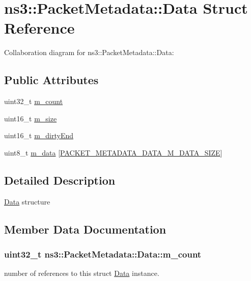 \hypertarget{structns3_1_1PacketMetadata_1_1Data}{}\section{ns3\+:\+:Packet\+Metadata\+:\+:Data Struct Reference}
\label{structns3_1_1PacketMetadata_1_1Data}


Collaboration diagram for ns3\+:\+:Packet\+Metadata\+:\+:Data\+:
\subsection*{Public Attributes}
\begin{DoxyCompactItemize}
\item 
uint32\+\_\+t \hyperlink{structns3_1_1PacketMetadata_1_1Data_ab1fff6472c58d4cbef74f8d78f64f95a}{m\+\_\+count}
\item 
uint16\+\_\+t \hyperlink{structns3_1_1PacketMetadata_1_1Data_a1064e5617aec301dd4f28fb86c105848}{m\+\_\+size}
\item 
uint16\+\_\+t \hyperlink{structns3_1_1PacketMetadata_1_1Data_ae98316cc438fb40663c2f848746d8935}{m\+\_\+dirty\+End}
\item 
uint8\+\_\+t \hyperlink{structns3_1_1PacketMetadata_1_1Data_a98540e1e160a9c59048d4cf615b8e2a2}{m\+\_\+data} \mbox{[}\hyperlink{packet-metadata_8h_a6e9dfb20738a271bc45a4c2929a9a500}{P\+A\+C\+K\+E\+T\+\_\+\+M\+E\+T\+A\+D\+A\+T\+A\+\_\+\+D\+A\+T\+A\+\_\+\+M\+\_\+\+D\+A\+T\+A\+\_\+\+S\+I\+ZE}\mbox{]}
\end{DoxyCompactItemize}


\subsection{Detailed Description}
\hyperlink{structns3_1_1PacketMetadata_1_1Data}{Data} structure 

\subsection{Member Data Documentation}
\subsubsection[{\texorpdfstring{m\+\_\+count}{m_count}}]{\setlength{\rightskip}{0pt plus 5cm}uint32\+\_\+t ns3\+::\+Packet\+Metadata\+::\+Data\+::m\+\_\+count}\hypertarget{structns3_1_1PacketMetadata_1_1Data_ab1fff6472c58d4cbef74f8d78f64f95a}{}\label{structns3_1_1PacketMetadata_1_1Data_ab1fff6472c58d4cbef74f8d78f64f95a}
number of references to this struct \hyperlink{structns3_1_1PacketMetadata_1_1Data}{Data} instance. 

